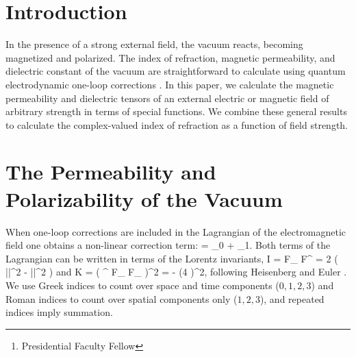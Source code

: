 \author{Jeremy S. Heyl \and Lars Hernquist\thanks{Presidential Faculty Fellow}}
\address{Lick Observatory, 
University of California, Santa Cruz, California 95064, USA}
\maketitle
\begin{abstract}
We use an analytic form for the Heisenberg-Euler Lagrangian
to calculate the birefringent and dichroic
 properties of the vacuum for arbitrarily strong wrenchless fields.
\end{abstract}

\section{Introduction}

In the presence of a strong external field, the vacuum reacts,
becoming magnetized and polarized.  The index of refraction, magnetic
permeability, and dielectric constant of the vacuum are
straightforward to calculate using quantum electrodynamic one-loop
corrections \cite{Klei64a,Klei64b,Erbe66,Adle71,Bere82,Miel88}.  In
this paper, we calculate the magnetic permeability and dielectric tensors of
an external electric or magnetic field of arbitrary strength in terms
of special functions.  We combine these general results to calculate
the complex-valued index of refraction as a function of field
strength.

\section{The Permeability and Polarizability of the Vacuum}

When one-loop corrections are included in the Lagrangian of the
electromagnetic field one obtains a non-linear correction term:
\be
\lag = \lag_0 + \lag_1.
\label{eq:lagdef}
\ee
Both terms of the Lagrangian can be written in terms of the Lorentz
invariants,
\be
I = F_{\mu\nu} F^{\mu\nu} = 2 \left ( |\bfi|^2 - |\efi|^2 \right )
\label{eq:Idef}
\ee
and
\be
K = \left (
\epsilon^{\lambda\rho\mu\nu} F_{\lambda\rho} F_{\mu\nu} \right )^2 =
	- (4 \efi \cdot \bfi )^2,
\label{eq:Kdef}
\ee
following Heisenberg and Euler \cite{Heis36}.  We use Greek indices to
count over space and time components ($0,1,2,3$) and Roman indices to
count over spatial components only ($1,2,3$), and repeated indices
imply summation.


